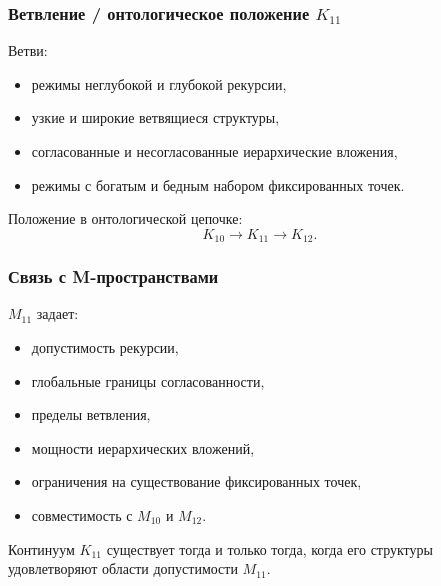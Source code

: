 \subsubsection{Ветвление / онтологическое положение $K_{11}$}

Ветви:
\begin{itemize}
    \item режимы неглубокой и глубокой рекурсии,
    \item узкие и широкие ветвящиеся структуры,
    \item согласованные и несогласованные иерархические вложения,
    \item режимы с богатым и бедным набором фиксированных точек.
\end{itemize}

Положение в онтологической цепочке:
\[
K_{10} \to K_{11} \to K_{12}.
\]

\subsubsection{Связь с M-пространствами}

$M_{11}$ задает:
\begin{itemize}
    \item допустимость рекурсии,
    \item глобальные границы согласованности,
    \item пределы ветвления,
    \item мощности иерархических вложений,
    \item ограничения на существование фиксированных точек,
    \item совместимость с $M_{10}$ и $M_{12}$.
\end{itemize}

Континуум $K_{11}$ существует тогда и только тогда, когда его структуры удовлетворяют области допустимости $M_{11}$.
